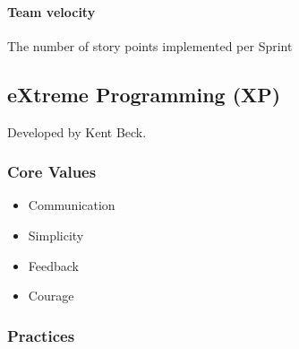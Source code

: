 \documentclass[../ESOF_notes.tex]{subfiles}
\begin{document}
\paragraph{Team velocity}

The number of story points implemented per Sprint

\subsection{eXtreme Programming (XP)}

Developed by Kent Beck.

\subsubsection{Core Values}

\begin{itemize}
    \item Communication
    \item Simplicity
    \item Feedback
    \item Courage
\end{itemize}

\subsubsection{Practices}
\end{document}
